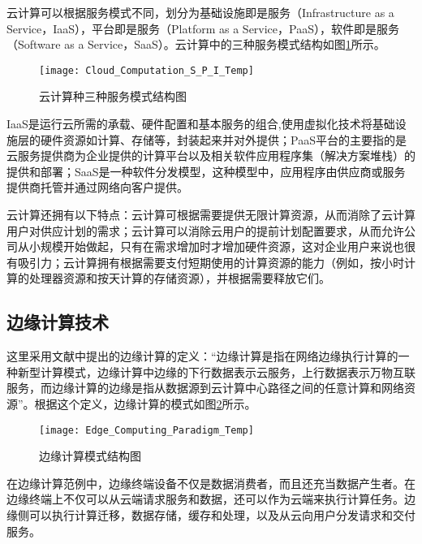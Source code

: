 云计算可以根据服务模式不同，划分为基础设施即是服务（Infrastructure as a Service，IaaS），平台即是服务（Platform as a Service，PaaS），软件即是服务（Software as a Service，SaaS）\cite{林伟伟2012云计算资源调度研究综述,roman2018mobile}。云计算中的三种服务模式结构如图\ref{fig:cloud_computation_S_P_I}所示\cite{刘英男2011基于云计算框架的终端管理系统设计与实现}。

\begin{figure}[!htbp]
    \centering
    \texttt{[image: Cloud\_Computation\_S\_P\_I\_Temp]}
    \caption{云计算种三种服务模式结构图}
    \label{fig:cloud_computation_S_P_I}
\end{figure}

IaaS是运行云所需的承载、硬件配置和基本服务的组合,使用虚拟化技术将基础设施层的硬件资源如计算、存储等，封装起来并对外提供；PaaS平台的主要指的是云服务提供商为企业提供的计算平台以及相关软件应用程序集（解决方案堆栈）的提供和部署；SaaS是一种软件分发模型，这种模型中，应用程序由供应商或服务提供商托管并通过网络向客户提供\cite{manvi2014resource}。

云计算还拥有以下特点：云计算可根据需要提供无限计算资源，从而消除了云计算用户对供应计划的需求；云计算可以消除云用户的提前计划配置要求，从而允许公司从小规模开始做起，只有在需求增加时才增加硬件资源，这对企业用户来说也很有吸引力；云计算拥有根据需要支付短期使用的计算资源的能力（例如，按小时计算的处理器资源和按天计算的存储资源），并根据需要释放它们\cite{fox2009above}。

\subsection{边缘计算技术}

这里采用文献\cite{施巍松2017边缘计算}中提出的边缘计算的定义：“边缘计算是指在网络边缘执行计算的一种新型计算模式，边缘计算中边缘的下行数据表示云服务，上行数据表示万物互联服务，而边缘计算的边缘是指从数据源到云计算中心路径之间的任意计算和网络资源”。根据这个定义，边缘计算的模式如图\ref{fig:edge_computing_paradigm}所示\cite{shi2016edge}。

\begin{figure}[!htbp]
    \centering
    \texttt{[image: Edge\_Computing\_Paradigm\_Temp]}
    \caption{边缘计算模式结构图}
    \label{fig:edge_computing_paradigm}
\end{figure}

在边缘计算范例中，边缘终端设备不仅是数据消费者，而且还充当数据产生者。在边缘终端上不仅可以从云端请求服务和数据，还可以作为云端来执行计算任务。边缘侧可以执行计算迁移，数据存储，缓存和处理，以及从云向用户分发请求和交付服务\cite{shi2016edge}。

